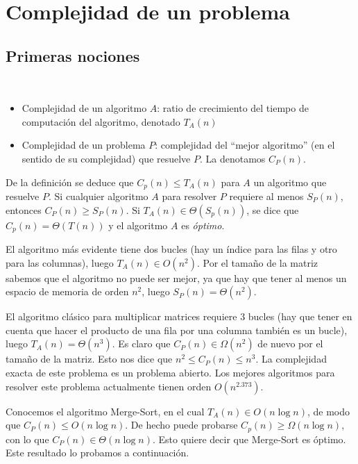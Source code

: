 \documentclass[AL.tex]{subfiles}
\begin{document}

\chapter{Complejidad de un problema}

\section{Primeras nociones}
\begin{defi}\
\begin{itemize}
\item Complejidad de un algoritmo $A$: ratio de crecimiento del tiempo de computación del algoritmo, denotado $T_A(n)$
\item Complejidad de un problema $P$: complejidad del ``mejor algoritmo'' (en el sentido de su complejidad) que resuelve $P$. La denotamos $C_P(n)$. 
\end{itemize}
\end{defi}
De la definición se deduce que $C_p(n)\leq T_A(n)$ para $A$ un algoritmo que resuelve $P$.  Si cualquier algoritmo $A$ para resolver $P$ requiere al menos $S_P(n)$, entonces $C_P(n)\geq S_P(n)$. Si $T_A(n)\in\Theta(S_p(n))$, se dice que $C_p(n)=\Theta(T(n))$ y el algoritmo $A$ es \emph{óptimo}. 

\begin{ej}
El algoritmo más evidente tiene dos bucles (hay un índice para las filas y otro para las columnas), luego $T_A(n)\in O(n^2)$. Por el tamaño de la matriz sabemos que el algoritmo no puede ser mejor, ya que hay que tener al menos un espacio de memoria de orden $n^2$, luego $S_P(n)=\Theta(n^2)$. 
\end{ej}

\begin{ej}
El algoritmo clásico para multiplicar matrices requiere 3 bucles (hay que tener en cuenta que hacer el producto de una fila por una columna también es un bucle), luego $T_A(n)=\Theta(n^3)$. Es claro que $C_P(n)\in\Omega(n^2)$ de nuevo por el tamaño de la matriz. Esto nos dice que $n^2\leq C_P(n)\leq n^3$. La complejidad exacta de este problema es un problema abierto. Los mejores algoritmos para resolver este problema actualmente tienen orden $O(n^{2.373})$. 
\end{ej}

\begin{ej}[Sorting]
Conocemos el algoritmo Merge-Sort, en el cual $T_A(n)\in O(n\log n)$, de modo que $C_P(n)\leq O(n\log n)$. De hecho puede probarse $C_p(n)\geq\Omega(n\log n)$, con lo que $C_P(n)\in\Theta(n\log n)$. Esto quiere decir que Merge-Sort es óptimo. Este resultado lo probamos a continuación.

\end{ej}
\end{document}
